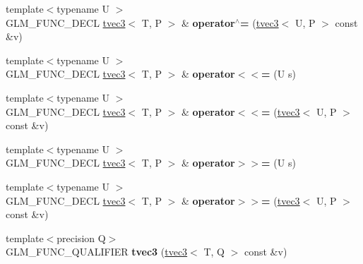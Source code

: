 \begin{DoxyCompactItemize}
\item 
\hypertarget{structglm_1_1detail_1_1tvec3_ad71ff1bf45dbb9470b34b55c9a8cd951}{{\footnotesize template$<$typename U $>$ }\\G\-L\-M\-\_\-\-F\-U\-N\-C\-\_\-\-D\-E\-C\-L \hyperlink{structglm_1_1detail_1_1tvec3}{tvec3}$<$ T, P $>$ \& {\bfseries operator$^\wedge$=} (\hyperlink{structglm_1_1detail_1_1tvec3}{tvec3}$<$ U, P $>$ const \&v)}\label{structglm_1_1detail_1_1tvec3_ad71ff1bf45dbb9470b34b55c9a8cd951}

\item 
\hypertarget{structglm_1_1detail_1_1tvec3_a9a985982567897cff02307730e4ae5a1}{{\footnotesize template$<$typename U $>$ }\\G\-L\-M\-\_\-\-F\-U\-N\-C\-\_\-\-D\-E\-C\-L \hyperlink{structglm_1_1detail_1_1tvec3}{tvec3}$<$ T, P $>$ \& {\bfseries operator$<$$<$=} (U s)}\label{structglm_1_1detail_1_1tvec3_a9a985982567897cff02307730e4ae5a1}

\item 
\hypertarget{structglm_1_1detail_1_1tvec3_a93c05e5b5b1a09319f62d30dac259516}{{\footnotesize template$<$typename U $>$ }\\G\-L\-M\-\_\-\-F\-U\-N\-C\-\_\-\-D\-E\-C\-L \hyperlink{structglm_1_1detail_1_1tvec3}{tvec3}$<$ T, P $>$ \& {\bfseries operator$<$$<$=} (\hyperlink{structglm_1_1detail_1_1tvec3}{tvec3}$<$ U, P $>$ const \&v)}\label{structglm_1_1detail_1_1tvec3_a93c05e5b5b1a09319f62d30dac259516}

\item 
\hypertarget{structglm_1_1detail_1_1tvec3_aaf71601d2b5d3be4eb778f1f3871a551}{{\footnotesize template$<$typename U $>$ }\\G\-L\-M\-\_\-\-F\-U\-N\-C\-\_\-\-D\-E\-C\-L \hyperlink{structglm_1_1detail_1_1tvec3}{tvec3}$<$ T, P $>$ \& {\bfseries operator$>$$>$=} (U s)}\label{structglm_1_1detail_1_1tvec3_aaf71601d2b5d3be4eb778f1f3871a551}

\item 
\hypertarget{structglm_1_1detail_1_1tvec3_a4b3fa6e8ad7b60b8bd7d87e9918bb9fc}{{\footnotesize template$<$typename U $>$ }\\G\-L\-M\-\_\-\-F\-U\-N\-C\-\_\-\-D\-E\-C\-L \hyperlink{structglm_1_1detail_1_1tvec3}{tvec3}$<$ T, P $>$ \& {\bfseries operator$>$$>$=} (\hyperlink{structglm_1_1detail_1_1tvec3}{tvec3}$<$ U, P $>$ const \&v)}\label{structglm_1_1detail_1_1tvec3_a4b3fa6e8ad7b60b8bd7d87e9918bb9fc}

\item 
\hypertarget{structglm_1_1detail_1_1tvec3_a24728ecfb1a04a02cf53f27e4a536395}{{\footnotesize template$<$precision Q$>$ }\\G\-L\-M\-\_\-\-F\-U\-N\-C\-\_\-\-Q\-U\-A\-L\-I\-F\-I\-E\-R {\bfseries tvec3} (\hyperlink{structglm_1_1detail_1_1tvec3}{tvec3}$<$ T, Q $>$ const \&v)}\label{structglm_1_1detail_1_1tvec3_a24728ecfb1a04a02cf53f27e4a536395}


\end{DoxyCompactItemize}
